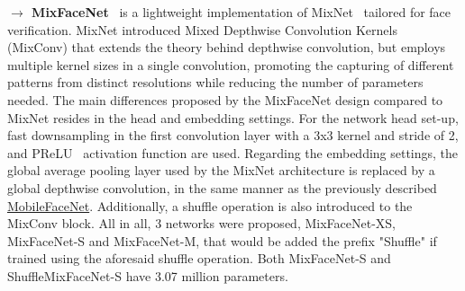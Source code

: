 \documentclass[class=report, crop=false, a4paper, 12pt]{standalone}
\begin{document}
\vspace{0.7\baselineskip}
\noindent\textbf{$\rightarrow$ MixFaceNet}~\autocite{boutrosMixFaceNetsExtremelyEfficient2021} is a lightweight implementation of MixNet~\autocite{tanMixConvMixedDepthwise} tailored for face verification. MixNet introduced Mixed Depthwise Convolution Kernels (MixConv) that extends the theory behind depthwise convolution, but employs multiple kernel sizes in a single convolution, promoting the capturing of different patterns from distinct resolutions while reducing the number of parameters needed. The main differences proposed by the MixFaceNet design compared to MixNet resides in the head and embedding settings. For the network head set-up, fast downsampling in the first convolution layer with a 3x3 kernel and stride of 2, and PReLU~\autocite{heDelvingDeepRectifiers2015} activation function are used. Regarding the embedding settings, the global average pooling layer used by the MixNet architecture is replaced by a global depthwise convolution, in the same manner as the previously described \hyperref[mobilefacenet]{MobileFaceNet}. Additionally, a shuffle operation is also introduced to the MixConv block. All in all, 3 networks were proposed, MixFaceNet-XS, MixFaceNet-S and MixFaceNet-M, that would be added the prefix "Shuffle" if trained using the aforesaid shuffle operation. Both MixFaceNet-S and ShuffleMixFaceNet-S have 3.07 million parameters.
\end{document}
